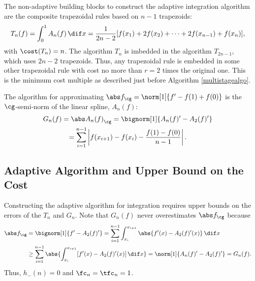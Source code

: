 The non-adaptive building blocks to construct the adaptive integration algorithm are the composite trapezoidal rules based on $n-1$ trapezoids:
\begin{equation*}
    T_{n}(f) = \int_0^1 A_n(f) \, \dif x 
    =\frac{1}{2n-2}[f(x_1)+2f(x_2)+\cdots+2f(x_{n-1})+f(x_n)],
\end{equation*}
with $\cost(T_n)=n$.  The algorithm $T_n$ is imbedded in the algorithm $T_{2n-1}$, which uses $2n-2$ trapezoids.  Thus, any trapezoidal rule is embedded in some other trapezoidal rule with cost no more than $r=2$ times the original one.  This is the minimum cost multiple as described just before Algorithm \ref{multistagealgo}.  

The algorithm for approximating $\Gnorm{f}=\norm[1]{f'-f(1)+f(0)}$ is the $\cg$-semi-norm of the linear spline, $A_n(f)$:
\begin{multline}\label{1direst}
    G_n(f)=\Gnorm{A_n(f)}=\bignorm[1]{A_n(f)'-A_2(f)'} \\
    =\sum_{i=1}^{n-1}\left|f(x_{i+1})-f(x_{i}) - \frac{f(1)-f(0)}{n-1}\right|.
\end{multline} 

\subsection{Adaptive Algorithm and Upper Bound on the Cost}

Constructing the adaptive algorithm for integration requires upper bounds on the errors of the $T_n$ and $G_n$.  Note that $G_{n}(f)$ never overestimates $\Gnorm{f}$ because 
\begin{align*}
\Gnorm{f} & = \bignorm[1]{f'-A_2(f)'} 
= \sum_{i=1}^{n-1} \int_{x_i}^{x_{i+1}} \abs{f'(x) - A_2(f)'(x)} \, \dif x \\
& \ge \sum_{i=1}^{n-1} \abs{\int_{x_i}^{x_{i+1}} [f'(x) - A_2(f)'(x)] \, \dif x}=\norm[1]{A_n(f)'-A_2(f)'} = G_n(f).
\end{align*}
Thus, $h_{-}(n)=0$ and $\fc_n=\tfc_n=1$. 

